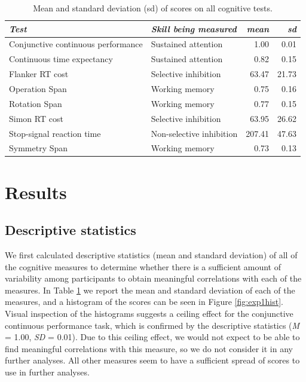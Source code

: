 \documentclass[
  man,floatsintext]{apa6}
\begin{document}
\begin{table}

\caption{\label{tab:cogskillsdesstats}Mean and standard deviation (sd) of scores on all cognitive tests.}
\centering
\begin{tabular}[t]{llrr}
\toprule
\em{Test} & \em{Skill being measured} & \em{mean} & \em{sd}\\
\midrule
Conjunctive continuous
 performance & Sustained attention & 1.00 & 0.01\\
Continuous time
 expectancy & Sustained attention & 0.82 & 0.15\\
Flanker RT cost & Selective inhibition & 63.47 & 21.73\\
Operation Span & Working memory & 0.75 & 0.16\\
Rotation Span & Working memory & 0.77 & 0.15\\
\addlinespace
Simon RT cost & Selective inhibition & 63.95 & 26.62\\
Stop-signal reaction time & Non-selective inhibition & 207.41 & 47.63\\
Symmetry Span & Working memory & 0.73 & 0.13\\
\bottomrule
\end{tabular}
\end{table}

\hypertarget{results}{%
\section{Results}\label{results}}

\hypertarget{descriptive-statistics}{%
\subsection{Descriptive statistics}\label{descriptive-statistics}}

We first calculated descriptive statistics (mean and standard deviation) of all of the cognitive measures to determine whether there is a sufficient amount of variability among participants to obtain meaningful correlations with each of the measures. In Table \ref{tab:cogskillsdesstats} we report the mean and standard deviation of each of the measures, and a histogram of the scores can be seen in Figure \ref{fig:exp1hist}. Visual inspection of the histograms suggests a ceiling effect for the conjunctive continuous performance task, which is confirmed by the descriptive statistics (\emph{M} = 1.00, \emph{SD} = 0.01). Due to this ceiling effect, we would not expect to be able to find meaningful correlations with this measure, so we do not consider it in any further analyses. All other measures seem to have a sufficient spread of scores to use in further analyses.
\end{document}

